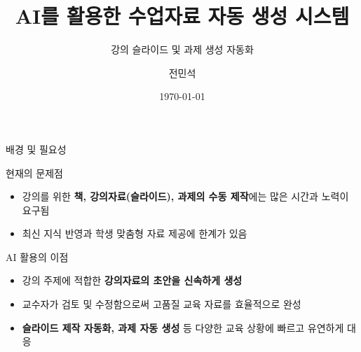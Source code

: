 \documentclass[aspectratio=169,xcolor=dvipsnames]{beamer}
\title[AI 활용 수업자료 생성]{AI를 활용한 수업자료 자동 생성 시스템}
\subtitle{강의 슬라이드 및 과제 생성 자동화}
\author{전민석}
\institute{DGIST}
\date{\today}
\begin{document}
\begin{frame}[plain]
  \titlepage
\end{frame}



\begin{frame}{배경 및 필요성}
  \begin{block}{현재의 문제점}
    \begin{itemize}
      \item 강의를 위한 \textbf{책, 강의자료(슬라이드), 과제의 수동 제작}에는 많은 시간과 노력이 요구됨
      \item 최신 지식 반영과 학생 맞춤형 자료 제공에 한계가 있음
    \end{itemize}
  \end{block}

  \vspace{0.5cm}

  \begin{exampleblock}{AI 활용의 이점}
    \begin{itemize}
      \item 강의 주제에 적합한 \textbf{강의자료의 초안을 신속하게 생성}
      \item 교수자가 검토 및 수정함으로써 고품질 교육 자료를 효율적으로 완성
      \item \textbf{슬라이드 제작 자동화, 과제 자동 생성} 등 다양한 교육 상황에 빠르고 유연하게 대응
    \end{itemize}
  \end{exampleblock}
\end{frame}


\end{document}
